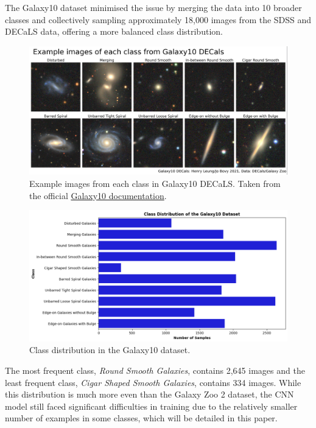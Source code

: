\documentclass[10pt,twocolumn,letterpaper]{article}
\begin{document}
The Galaxy10 dataset minimised the issue by merging the data into 10 broader classes and collectively sampling approximately 18,000 images from the SDSS and DECaLS data, offering a more balanced class distribution.
\begin{figure}[htbp]
    \includegraphics[width=\linewidth]{galaxy10_images.png}
    \caption{Example images from each class in Galaxy10 DECaLS. Taken from the official \href{https://astronn.readthedocs.io/en/latest/galaxy10.html}{Galaxy10 documentation}.}
    \label{fig:galaxyimgs}
  \end{figure}
  \begin{figure}[htbp]
    \includegraphics[width=\linewidth]{galaxy_distribution2.png}
    \caption{Class distribution in the Galaxy10 dataset.}
    \label{fig:featuredist2}
  \end{figure}
\noindent The most frequent class, \textit{Round Smooth Galaxies}, contains 2,645 images and the least frequent class, \textit{Cigar Shaped Smooth Galaxies}, contains 334 images.
While this distribution is much more even than the Galaxy Zoo 2 dataset, the CNN model still faced significant difficulties in training due to the relatively smaller number of examples in some classes, which will be detailed in this paper.
\end{document}
